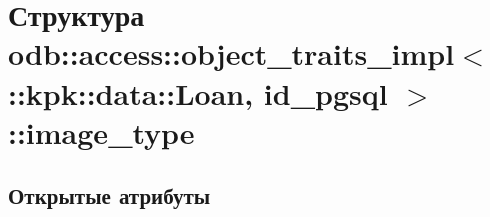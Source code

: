 \hypertarget{structodb_1_1access_1_1object__traits__impl_3_01_1_1kpk_1_1data_1_1_loan_00_01id__pgsql_01_4_1_1image__type}{}\section{Структура odb\+:\+:access\+:\+:object\+\_\+traits\+\_\+impl$<$ \+:\+:kpk\+:\+:data\+:\+:Loan, id\+\_\+pgsql $>$\+:\+:image\+\_\+type}
\label{structodb_1_1access_1_1object__traits__impl_3_01_1_1kpk_1_1data_1_1_loan_00_01id__pgsql_01_4_1_1image__type}
\subsection*{Открытые атрибуты}
